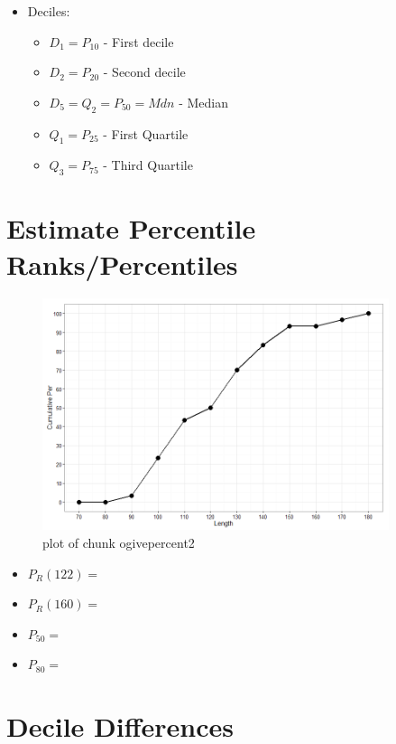 \documentclass[12pt]{article}
\begin{document}
\begin{itemize}
\itemsep1pt\parskip0pt
\item
  Deciles:

  \begin{itemize}
  \itemsep1pt\parskip0pt
  \item
    \(D_{1} = P_{10}\) - First decile
  \item
    \(D_{2} = P_{20}\) - Second decile
  \item
    \(D_{5} = Q_{2} = P_{50} = Mdn\) - Median
  \item
    \(Q_{1} = P_{25}\) - First Quartile
  \item
    \(Q_{3} = P_{75}\) - Third Quartile
  \end{itemize}
\end{itemize}

\section{Estimate Percentile
Ranks/Percentiles}\label{estimate-percentile-rankspercentiles}

\begin{figure}[H]
\centering
\includegraphics[width=4in]{figure/ogivepercent2-1.png}
\caption{plot of chunk ogivepercent2}
\end{figure}

\begin{itemize}
\itemsep1pt\parskip0pt
\item
  $P_{R}(122) = $
\item
  $P_{R}(160) = $
\item
  $P_{50} = $
\item
  $P_{80} = $
\end{itemize}

\section{Decile Differences}\label{decile-differences}
\end{document}
